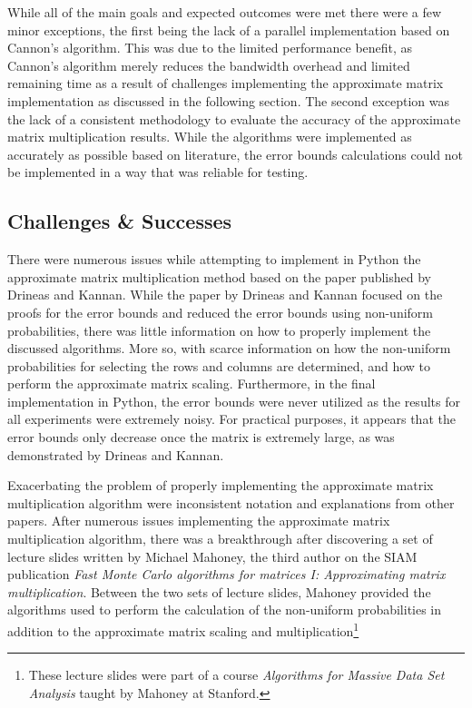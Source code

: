 \documentclass[oneside]{article}
\begin{document}
While all of the main goals and expected outcomes were met there were a few minor exceptions, the first being the lack of a parallel implementation based on Cannon's algorithm. This was due to the limited performance benefit, as Cannon's algorithm merely reduces the bandwidth overhead\cite{lee1997generalized} and limited remaining time as a result of challenges implementing the approximate matrix implementation as discussed in the following section. The second exception was the lack of a consistent methodology to evaluate the accuracy of the approximate matrix multiplication results. While the algorithms were implemented as accurately as possible based on literature, the error bounds calculations could not be implemented in a way that was reliable for testing.




\subsection{Challenges \& Successes}

There were numerous issues while attempting to implement in Python the approximate matrix multiplication method based on the paper published by Drineas and Kannan. While the paper by Drineas and Kannan focused on the proofs for the error bounds and reduced the error bounds using non-uniform probabilities, there was little information on how to properly implement the discussed algorithms. More so, with scarce information on how the non-uniform probabilities for selecting the rows and columns are determined, and how to perform the approximate matrix scaling. Furthermore, in the final implementation in Python, the error bounds were never utilized as the results for all experiments were extremely noisy. For practical purposes, it appears that the error bounds only decrease once the matrix is extremely large, as was demonstrated by Drineas and Kannan\cite{drineas2001fast}.

Exacerbating the problem of properly implementing the approximate matrix multiplication algorithm were inconsistent notation and explanations from other papers. After numerous issues implementing the approximate matrix multiplication algorithm, there was a breakthrough after discovering a set of lecture slides written by Michael Mahoney, the third author on the SIAM publication \emph{Fast Monte Carlo algorithms for matrices I: Approximating matrix multiplication}\cite{drineas2006fastI}. Between the two sets of lecture slides\cite{mahoneyCS369M, mahoneyCS294}, Mahoney provided the algorithms used to perform the calculation of the non-uniform probabilities in addition to the approximate matrix scaling and multiplication\footnote{These lecture slides were part of a course \emph{Algorithms for Massive Data Set Analysis} taught by Mahoney at Stanford.}
\end{document}
